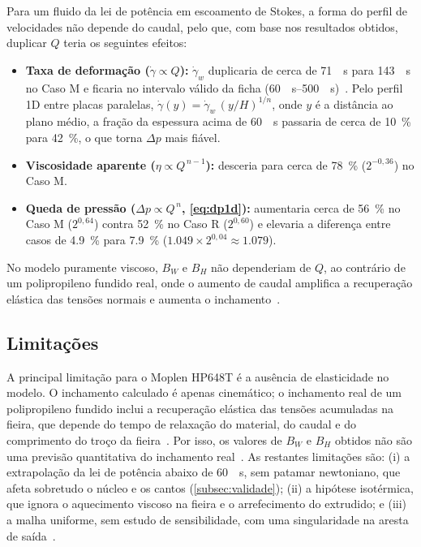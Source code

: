 Para um fluido da lei de potência em escoamento de Stokes, a forma do perfil de velocidades não depende do caudal, pelo que, com base nos resultados obtidos, duplicar $Q$ teria os seguintes efeitos:
\begin{itemize}
    \item \textbf{Taxa de deformação ($\dot{\gamma} \propto Q$):} $\dot{\gamma}_w$ duplicaria de cerca de \qty{71}{\per\second} para \qty{143}{\per\second} no Caso M e ficaria no intervalo válido da ficha (\qtyrange{60}{500}{\per\second})~\cite{FichaMoplen}. Pelo perfil 1D entre placas paralelas, $\dot{\gamma}(y) = \dot{\gamma}_w\,(y/H)^{1/n}$, onde $y$ é a distância ao plano médio, a fração da espessura acima de \qty{60}{\per\second} passaria de cerca de \qty{10}{\percent} para \qty{42}{\percent}, o que torna $\Delta p$ mais fiável.
    \item \textbf{Viscosidade aparente ($\eta \propto Q^{\,n-1}$):} desceria para cerca de \qty{78}{\percent} ($2^{-0,36}$) no Caso M.
    \item \textbf{Queda de pressão ($\Delta p \propto Q^{\,n}$, \autoref{eq:dp1d}):} aumentaria cerca de \qty{56}{\percent} no Caso M ($2^{0,64}$) contra \qty{52}{\percent} no Caso R ($2^{0,60}$) e elevaria a diferença entre casos de \qty{4,9}{\percent} para \qty{7,9}{\percent} ($\num{1,049} \times 2^{0,04} \approx \num{1,079}$).
\end{itemize}
No modelo puramente viscoso, $B_W$ e $B_H$ não dependeriam de $Q$, ao contrário de um polipropileno fundido real, onde o aumento de caudal amplifica a recuperação elástica das tensões normais e aumenta o inchamento~\cite{Tang2019Polypropylene}.

\subsection{Limitações}

A principal limitação para o Moplen HP648T é a ausência de elasticidade no modelo. O inchamento calculado é apenas cinemático; o inchamento real de um polipropileno fundido inclui a recuperação elástica das tensões acumuladas na fieira, que depende do tempo de relaxação do material, do caudal e do comprimento do troço da fieira~\cite{Tang2019Polypropylene}. Por isso, os valores de $B_W$ e $B_H$ obtidos não são uma previsão quantitativa do inchamento real~\cite{Zhang2026Anisotropic}. As restantes limitações são: (i) a extrapolação da lei de potência abaixo de \qty{60}{\per\second}, sem patamar newtoniano, que afeta sobretudo o núcleo e os cantos (\autoref{subsec:validade}); (ii) a hipótese isotérmica, que ignora o aquecimento viscoso na fieira e o arrefecimento do extrudido; e (iii) a malha uniforme, sem estudo de sensibilidade, com uma singularidade na aresta de saída~\cite{Comminal2018Extrudate}.

